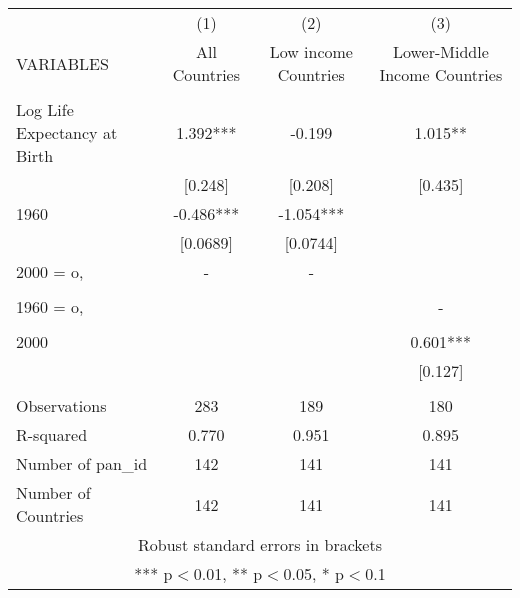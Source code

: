 \documentclass[]{article}
\begin{document}
\begin{tabular}{lccc} \hline
 & (1) & (2) & (3) \\
VARIABLES & All Countries & Low income Countries & Lower-Middle Income Countries \\ \hline
 &  &  &  \\
Log Life Expectancy at Birth & 1.392*** & -0.199 & 1.015** \\
 & [0.248] & [0.208] & [0.435] \\
1960 & -0.486*** & -1.054*** &  \\
 & [0.0689] & [0.0744] &  \\
2000 = o, & - & - &  \\
 &  &  &  \\
1960 = o, &  &  & - \\
 &  &  &  \\
2000 &  &  & 0.601*** \\
 &  &  & [0.127] \\
 &  &  &  \\
Observations & 283 & 189 & 180 \\
R-squared & 0.770 & 0.951 & 0.895 \\
Number of pan\_id & 142 & 141 & 141 \\
 Number of Countries & 142 & 141 & 141 \\ \hline
\multicolumn{4}{c}{ Robust standard errors in brackets} \\
\multicolumn{4}{c}{ *** p$<$0.01, ** p$<$0.05, * p$<$0.1} \\
\end{tabular}
\end{document}
